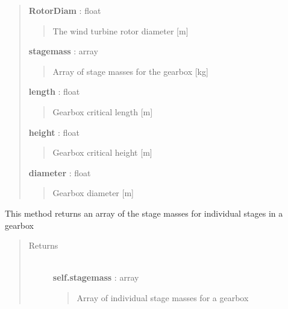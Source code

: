 \documentclass[letterpaper,10pt,openany,oneside]{sphinxmanual}
\begin{document}
\begin{fulllineitems}
\begin{quote}
\begin{description}
\textbf{RotorDiam} : float
\begin{quote}

The wind turbine rotor diameter {[}m{]}
\end{quote}

\textbf{stagemass} : array
\begin{quote}

Array of stage masses for the gearbox {[}kg{]}
\end{quote}

\textbf{length} : float
\begin{quote}

Gearbox critical length {[}m{]}
\end{quote}

\textbf{height} : float
\begin{quote}

Gearbox critical height {[}m{]}
\end{quote}

\textbf{diameter} : float
\begin{quote}

Gearbox diameter {[}m{]}
\end{quote}

\end{description}\end{quote}

\begin{fulllineitems}
\label{documentation:nacelleSE.src.nacelle_components.Gearbox.getStageMass}
This method returns an array of the stage masses for individual stages in a gearbox
\begin{quote}\begin{description}
\item[{Returns }] \leavevmode\\
\textbf{self.stagemass} : array
\begin{quote}

Array of individual stage masses for a gearbox
\end{quote}

\end{description}\end{quote}

\end{fulllineitems}


\end{fulllineitems}
\end{document}
